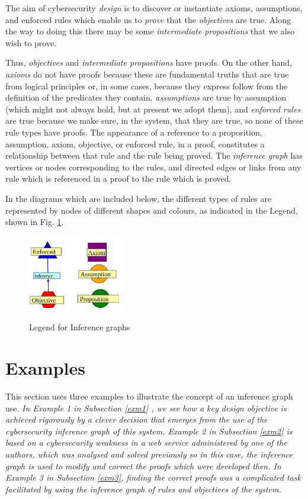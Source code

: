 The aim of cybersecurity {\em design} is to discover or instantiate axioms,
assumptions, and enforced rules which enable us to {\em prove} that
the {\em objectives} are true. Along the way to doing this there may
be some {\em intermediate propositions} that we also wish to prove.

Thus, {\em objectives} and {\em intermediate propositions} have proofs.
On the other hand, {\em axioms} do not have proofs because these are
fundamental truths that are true from logical principles
or, in some cases, because they express follow from the definition 
of the predicates they contain, {\em assumptions}
are true by assumption (which might not always hold, but at present
we adopt them), and {\em enforced rules} are true because we make sure,
in the system, that they are true, so none of these rule types
have proofs.
The appearance of a reference to a
proposition, assumption, axiom, objective, or enforced
rule, in a proof,  constitutes a relationship between that rule
and the rule being proved. The {\em inference graph} has vertices or
nodes corresponding to the rules, and directed edges or links from any
rule which is referenced in a proof to the rule which is proved.


In the diagrams which are included below, the different types of rules
are represented by nodes of different shapes and colours, as 
indicated in the Legend, shown in Fig. \ref{legend}.
\begin{figure}[bhpt]
	\centering
		\leavevmode\includegraphics[width=42mm]{figures/legend.png}\ \\
		\caption{Legend for Inference graphs}\label{legend}
\end{figure}

\section{Examples}\label{examplesec}
This section uses three examples to illustrate the concept of an inference graph use. {\em In Example 1 in Subsection \ref{exm1} , we see how a key design objective is achieved rigorously by a clever decision that emerges from the use of the cybersecurity inference graph of this system. Example 2 in Subsection \ref{exm2} is based on a cybersecurity weakness in a web service administered by one of the authors, which was analysed and solved previously \cite{exptsandproofs} so in this case, the inference graph is used to modify and correct the proofs which were developed then. In Example 3 in Subsection \ref{exm3}, finding the correct proofs was a complicated task facilitated by using the inference graph of rules and objectives of the system.}
